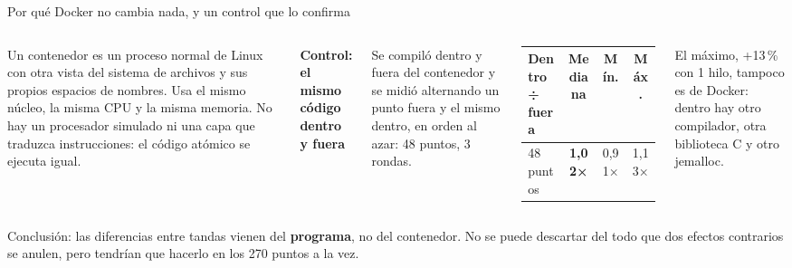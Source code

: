\begin{frame}{Por qué Docker no cambia nada, y un control que lo confirma}
  \begin{columns}[T,onlytextwidth]
    \begin{porque}
      Un contenedor es un proceso normal de Linux con otra vista del sistema de archivos y sus propios espacios de nombres. Usa el mismo núcleo, la misma CPU y la misma memoria. No hay un procesador simulado ni una capa que traduzca instrucciones: el código atómico se ejecuta igual.
    \end{porque}
    \small\textbf{\color{marino}Control: el mismo código dentro y fuera}\par\vspace{1mm}
    \footnotesize Se compiló  dentro y fuera del contenedor y se midió alternando un punto fuera y el mismo dentro, en orden al azar: 48 puntos, 3 rondas.\par\vspace{2mm}
    \begin{tabular}{@{}lccc@{}}
      \toprule
      \textbf{Dentro ÷ fuera} & \textbf{Mediana} & \textbf{Mín.} & \textbf{Máx.}\\
      \midrule
      48 puntos & \textbf{1,02×} & 0,91× & 1,13×\\
      \bottomrule
    \end{tabular}\par\vspace{1mm}
    \scriptsize El máximo, +13\,\% con 1 hilo, tampoco es de Docker: dentro hay otro compilador, otra biblioteca C y otro jemalloc.
  \end{columns}
  \vspace{2mm}
  \begin{idea}Conclusión: las diferencias entre tandas vienen del \textbf{programa}, no del contenedor. No se puede descartar del todo que dos efectos contrarios se anulen, pero tendrían que hacerlo en los 270 puntos a la vez.\end{idea}
\end{frame}

